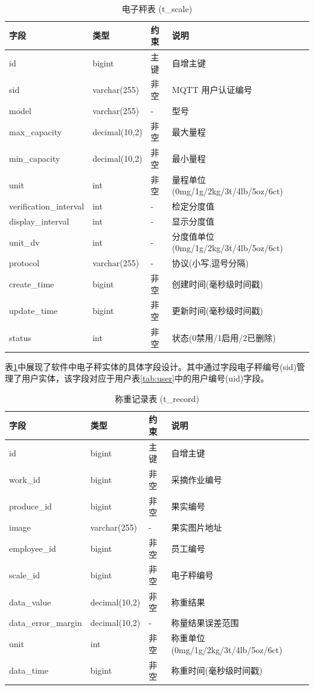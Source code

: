 \begin{table}[H]
\centering
\caption{电子秤表 (t\_scale)}
\label{tab:scale}
\begin{tabular}{|l|l|l|l|}
\hline
字段 & 类型 & 约束 & 说明 \\
\hline
id & bigint & 主键 & 自增主键 \\
sid & varchar(255) & 非空 & MQTT 用户认证编号 \\
model & varchar(255) & - & 型号 \\
max\_capacity & decimal(10,2) & 非空 & 最大量程 \\
min\_capacity & decimal(10,2) & 非空 & 最小量程 \\
unit & int & 非空 & 量程单位(0mg/1g/2kg/3t/4lb/5oz/6ct) \\
verification\_interval & int & - & 检定分度值 \\
display\_interval & int & - & 显示分度值 \\
unit\_dv & int & - & 分度值单位(0mg/1g/2kg/3t/4lb/5oz/6ct) \\
protocol & varchar(255) & - & 协议(小写,逗号分隔) \\
create\_time & bigint & 非空 & 创建时间(毫秒级时间戳) \\
update\_time & bigint & 非空 & 更新时间(毫秒级时间戳) \\
status & int & 非空 & 状态(0禁用/1启用/2已删除) \\
\hline
\end{tabular}
\end{table}

表\ref{tab:scale}中展现了软件中电子秤实体的具体字段设计。其中通过字段电子秤编号(sid)管理了用户实体，该字段对应于用户表\ref{tab:user}中的用户编号(uid)字段。

\begin{table}[H]
\centering
\caption{称重记录表 (t\_record)}
\label{tab:record}
\begin{tabular}{|l|l|l|l|}
\hline
字段 & 类型 & 约束 & 说明 \\
\hline
id & bigint & 主键 & 自增主键 \\
work\_id & bigint & 非空 & 采摘作业编号 \\
produce\_id & bigint & 非空 & 果实编号 \\
image & varchar(255) & - & 果实图片地址 \\
employee\_id & bigint & 非空 & 员工编号 \\
scale\_id & bigint & 非空 & 电子秤编号 \\
data\_value & decimal(10,2) & 非空 & 称重结果 \\
data\_error\_margin & decimal(10,2) & - & 称量结果误差范围 \\
unit & int & 非空 & 称重单位(0mg/1g/2kg/3t/4lb/5oz/6ct) \\
data\_time & bigint & 非空 & 称重时间(毫秒级时间戳) \\
\hline
\end{tabular}
\end{table}

